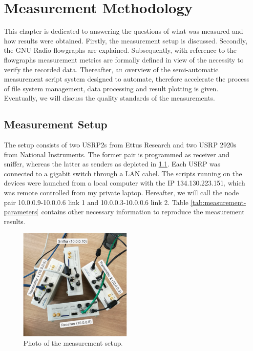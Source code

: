 \chapter{Measurement Methodology}

This chapter is dedicated to answering the questions of what was measured and how results were obtained. Firstly, the measurement setup is discussed. Secondly,  the GNU Radio flowgraphs are explained. Subsequently, with reference to the flowgraphs measurement metrics are formally defined in view of the necessity to verify the recorded data.  Thereafter, an overview of the semi-automatic measurement script system designed to automate, therefore accelerate the process of file system management, data processing and result plotting is given. Eventually, we will discuss the quality standards of the measurements.

\section{Measurement Setup}

The setup consists of two USRP2s from Ettus Research and two USRP 2920s from National Instruments. The former pair is programmed as receiver and sniffer, whereas the latter as senders as depicted in \ref{fig:measurement-setup}. Each USRP was connected to a gigabit switch through a LAN cabel. The scripts running on the devices were launched from a local computer with the IP 134.130.223.151, which was remote controlled from my private laptop. Hereafter, we will call the node pair 10.0.0.9-10.0.0.6 link 1 and 10.0.0.3-10.0.0.6 link 2. Table \ref{tab:measurement-parameters} contains other necessary information to reproduce the measurement results.

\begin{figure}[tb]
	\label{fig:measurement-setup}
	\begin{center}
		\includegraphics[width=0.5\textwidth]{pictures/measurement_setup}
	\end{center}
	\caption{Photo of the measurement setup.}
\end{figure}

